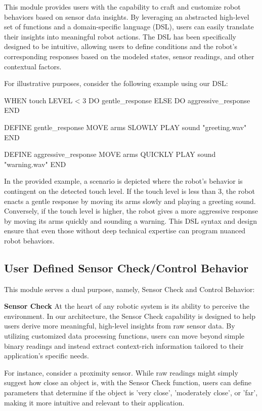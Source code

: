\documentclass[runningheads]{llncs}
\begin{document}
This module provides users with the capability to craft and customize robot behaviors based on sensor data insights. By leveraging an abstracted high-level set of functions and a domain-specific language (DSL), users can easily translate their insights into meaningful robot actions. The DSL has been specifically designed to be intuitive, allowing users to define conditions and the robot's corresponding responses based on the modeled states, sensor readings, and other contextual factors.

For illustrative purposes, consider the following example using our DSL:

\begin{mydsl}
WHEN touch LEVEL < 3
DO gentle_response
ELSE
DO aggressive_response
END

DEFINE gentle_response
MOVE arms SLOWLY
PLAY sound "greeting.wav"
END

DEFINE aggressive_response
MOVE arms QUICKLY
PLAY sound "warning.wav"
END
\end{mydsl}

In the provided example, a scenario is depicted where the robot's behavior is contingent on the detected touch level. If the touch level is less than 3, the robot enacts a gentle response by moving its arms slowly and playing a greeting sound. Conversely, if the touch level is higher, the robot gives a more aggressive response by moving its arms quickly and sounding a warning. This DSL syntax and design ensure that even those without deep technical expertise can program nuanced robot behaviors.

\subsection{User Defined Sensor Check/Control Behavior}

This module serves a dual purpose, namely, Sensor Check and Control Behavior:

\noindent\textbf{Sensor Check}
At the heart of any robotic system is its ability to perceive the environment. In our architecture, the Sensor Check capability is designed to help users derive more meaningful, high-level insights from raw sensor data. By utilizing customized data processing functions, users can move beyond simple binary readings and instead extract context-rich information tailored to their application's specific needs.

For instance, consider a proximity sensor. While raw readings might simply suggest how close an object is, with the Sensor Check function, users can define parameters that determine if the object is 'very close', 'moderately close', or 'far', making it more intuitive and relevant to their application.
\end{document}
